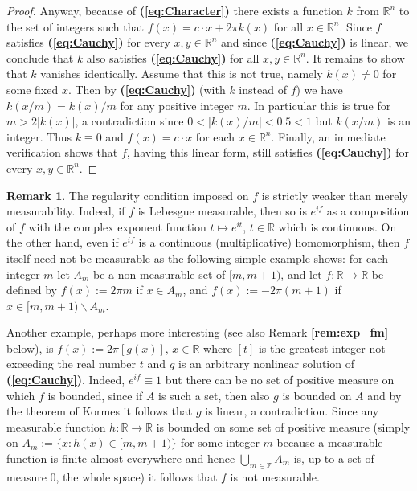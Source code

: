 \documentclass[12 pt]{amsart}
\theoremstyle{definition}
\newtheorem{remark}[thm]{Remark}
\newcommand{\R}{\mathbb{R}}
\newcommand{\Z}{\mathbb{Z}}
\newcommand{\bref}[1]{\textbf{\ref{#1}}} %
\newcommand{\beqref}[1]{\textbf{(\ref{#1})}} %
\begin{document}
\begin{proof}
Anyway, because of \beqref{eq:Character} there exists a function $k$ from $\R^n$ to the set of  integers such that $f(x)=c\cdot x+2\pi k(x)$ for all $x\in \R^n$. Since $f$ satisfies \beqref{eq:Cauchy} for every $x,y\in\R^n$ 
and since \beqref{eq:Cauchy} is linear, we conclude that $k$ also satisfies \beqref{eq:Cauchy} for all $x,y\in\R^n$. It remains to show that $k$ vanishes identically. Assume that this is not true, 
namely $k(x)\neq 0$ for some fixed $x$. Then by \beqref{eq:Cauchy} (with $k$ instead of $f$) we have $k(x/m)=k(x)/m$ for any positive integer $m$. In particular this is true for $m>2|k(x)|$, a  contradiction since $0<|k(x)/m|<0.5<1$  but $k(x/m)$ is an integer. Thus $k\equiv 0$ and $f(x)=c\cdot x$ for each $x\in\R^n$. Finally, an immediate verification shows that $f$, having this linear form, still satisfies \beqref{eq:Cauchy} for every $x,y\in\R^n$. 
\end{proof}


\begin{remark}\label{rem:e^if}
 The regularity condition imposed on $f$ is strictly weaker than merely measurability. 
 Indeed, if $f$ is Lebesgue measurable, then so is $e^{if}$ as a composition of $f$ with the  complex exponent function 
 $t\mapsto e^{it}$, $t\in\R$ which is continuous. On the other hand, even if $e^{if}$ is a continuous (multiplicative) homomorphism,  then $f$ itself need not be  measurable as the following simple  example shows:  for each integer $m$ let $A_m$  be a  non-measurable set of $[m,m+1)$,  and let $f:\R\to\R$ be defined by $f(x):=2\pi m$ if $x\in A_m$, and $f(x):=-2\pi (m+1)$ if $x\in [m,m+1)\backslash A_m$. 
 
 Another example, perhaps more interesting (see also Remark \bref{rem:exp_fm} below), is $f(x):=2\pi [g(x)],\,x\in\R$ where 
 $[t]$ is the greatest integer not exceeding the real number $t$ and $g$ is an arbitrary nonlinear solution of \beqref{eq:Cauchy}. 
 Indeed, $e^{if}\equiv 1$ but there can be no set of positive measure on which $f$ is bounded, since if 
 $A$ is such a set, then also $g$ is bounded on $A$ and by the theorem of Kormes \cite[Theorem I]{Kormes} 
 it follows that $g$ is linear, a contradiction. Since any measurable function $h:\R\to\R$ is bounded 
 on some set of positive measure (simply on $A_m:=\{x: h(x)\in [m,m+1)\}$ for some integer $m$ because 
 a measurable function is finite almost everywhere and hence $\bigcup_{m\in\Z}A_m$ 
 is, up to a set of measure 0, the whole space) it follows that $f$ is not measurable. 
\end{remark} 
\end{document}

